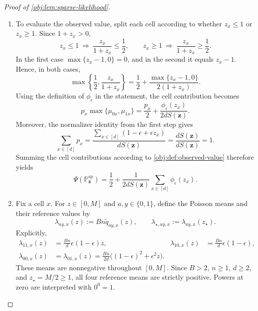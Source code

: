 \documentclass[11pt]{article}
\begin{document}
\begin{proof}[Proof of \cref{obj:lem:sparse-likelihood}]
\begin{enumerate}
\item To evaluate the observed value, split each cell according to whether \(z_x\le1\) or \(z_x\ge1\). Since \(1+z_x>0\),
\[
z_x\le1\ \Longrightarrow\ \frac{z_x}{1+z_x}\le\frac12,
\qquad
z_x\ge1\ \Longrightarrow\ \frac{z_x}{1+z_x}\ge\frac12.
\]
In the first case \(\max\{z_x-1,0\}=0\), and in the second it equals \(z_x-1\). Hence, in both cases,
\[
\max\left\{\frac12,\frac{z_x}{1+z_x}\right\}
=\frac12+\frac{\max\{z_x-1,0\}}{2(1+z_x)}.
\]
Using the definition of \(\phi_\epsilon\) in the statement, the cell contribution becomes
\[
p_x\max\{\mu_{0x},\mu_{1x}\}
=\frac{p_x}{2}
+\frac{\phi_\epsilon(z_x)}{2dS(\mathbf z)}.
\]
Moreover, the normalizer identity from the first step gives
\[
\sum_{x\in[d]}p_x
=\frac{\sum_{x\in[d]}(1-\epsilon+\epsilon z_x)}
{dS(\mathbf z)}
=\frac{dS(\mathbf z)}{dS(\mathbf z)}
=1.
\]
Summing the cell contributions according to \cref{obj:def:observed-value} therefore yields
\[
\Psi(\mathbb P_{\mathbf z}^{\mathrm{sp}})
=\frac12+\frac{1}{2dS(\mathbf z)}
\sum_{x\in[d]}\phi_\epsilon(z_x).
\]

\item Fix a cell \(x\). For \(z\in[0,M]\) and \(a,y\in\{0,1\}\), define the Poisson means and their reference values by
\[
\lambda_{ay,x}(z):=Bn\widetilde q_{ay,x}(z),
\qquad
\lambda_{\star,ay,x}:=\lambda_{ay,x}(z_\star).
\]
Explicitly,
\[
\begin{aligned}
\lambda_{11,x}(z)&=\frac{Bn}{d}\epsilon(1-\epsilon)z,
&
\lambda_{10,x}(z)&=\frac{Bn}{d}\epsilon(1-\epsilon),\\
\lambda_{00,x}(z)&=\lambda_{01,x}(z)
=\frac{Bn}{2d}\bigl((1-\epsilon)^2+\epsilon^2z\bigr).
\end{aligned}
\]
These means are nonnegative throughout \([0,M]\). Since \(B>2\), \(n\ge1\), \(d\ge2\), and \(z_\star=M/2\ge1\), all four reference means are strictly positive. Powers at zero are interpreted with \(0^0=1\).


\end{enumerate}
\end{proof}
\end{document}
